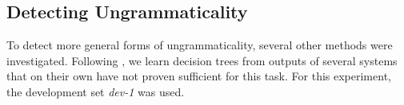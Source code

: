 \documentclass[a4paper,10pt]{scrartcl}
\theoremstyle{style}
\begin{document}




\subsection{Detecting Ungrammaticality}
To detect more general forms of ungrammaticality, several other methods were investigated. Following \cite{wagner2007comparative}, we learn decision trees from outputs of several systems that on their own have not proven sufficient for this task. For this experiment, the development set \textit{dev-1} was used.
\end{document}
